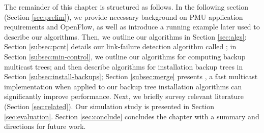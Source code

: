 The remainder of this chapter is structured as follows.  In the following section (Section \ref{sec:prelim}), we provide necessary background on PMU application requirements and OpenFlow, as well
as introduce a running example later used to describe our algorithms.  
Then, we outline our algorithms in Section \ref{sec:algs}:
Section \ref{subsec:pcnt} details our link-failure detection algorithm called \pcnts; in Section \ref{subsec:min-control}, we outline our algorithms for computing backup multicast trees; and
then describe algorithms for installation backup trees in Section \ref{subsec:install-backups}; Section \ref{subsec:merge} presents \merges, a fast multicast implementation 
when applied to our backup tree installation algorithms can significantly improve performance.
Next, we briefly survey relevant literature (Section \ref{sec:related}).
Our simulation study is presented in Section \ref{sec:evaluation}. Section \ref{sec:conclude} concludes the chapter with a summary and directions for future work.

